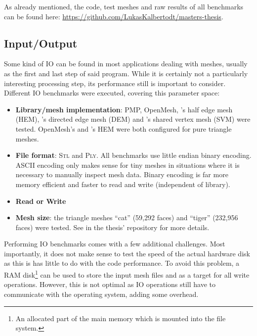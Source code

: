 As already mentioned, the code, test meshes and raw results of all benchmarks can be found here: \url{https://github.com/LukasKalbertodt/masters-thesis}.



\newpage
\subsection{Input/Output}

Some kind of IO can be found in most applications dealing with meshes, usually as the first and last step of said program.
While it is certainly not a particularly interesting processing step, its performance still is important to consider.
Different IO benchmarks were executed, covering this parameter space:

\begin{itemize}
  \item \textbf{Library/mesh implementation}: PMP, OpenMesh, 's half edge mesh (HEM), 's directed edge mesh (DEM) and 's shared vertex mesh (SVM) were tested.
  OpenMesh's and 's HEM were both configured for pure triangle meshes.
  \item \textbf{File format}: \textsc{Stl} and \textsc{Ply}.
  All benchmarks use little endian binary encoding.
  ASCII encoding only makes sense for tiny meshes in situations where it is necessary to manually inspect mesh data.
  Binary encoding is far more memory efficient and faster to read and write (independent of library).
  \item \textbf{Read or Write}
  \item \textbf{Mesh size}: the triangle meshes \enquote{cat} (59,292 faces) and \enquote{tiger} (232,956 faces) were tested.
  See  in the thesis' repository for more details.
\end{itemize}

Performing IO benchmarks comes with a few additional challenges.
Most importantly, it does not make sense to test the speed of the actual hardware disk as this is has little to do with the code performance.
To avoid this problem, a RAM disk\footnote{An allocated part of the main memory which is mounted into the file system.} can be used to store the input mesh files and as a target for all write operations.
However, this is not optimal as IO operations still have to communicate with the operating system, adding some overhead.

